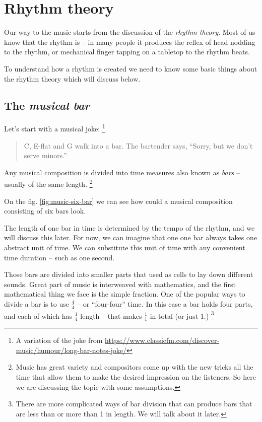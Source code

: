\documentclass[../sparc.tex]{subfiles}
\begin{document}
\newpage
\section{Rhythm theory}

Our way to the music starts from the discussion of the \emph{rhythm theory}.
Most of us know that the rhythm is -- in many people it produces the reflex of
head nodding to the rhythm, or mechanical finger tapping on a tabletop to the
rhythm beats.

To understand how a rhythm is created we need to know some basic things about
the rhythm theory which will discuss below.

\subsection{The \emph{musical bar}}

Let's start with a musical joke: \footnote{A variation of the joke from
\url{https://www.classicfm.com/discover-music/humour/long-bar-notes-joke/}}

\begin{quotation}
C, E-flat and G walk into a bar.  The bartender says, ``Sorry, but we don’t
serve minors.''
\end{quotation}

Any musical composition is divided into time measures also known as \emph{bars}
-- usually of the same length. \footnote{Music has great variety and compositors
come up with the new tricks all the time that allow them to make the desired
impression on the listeners.  So here we are discussing the topic with some
assumptions.}

On the fig. \ref{fig:music-six-bar} we can see how could a musical composition
consisting of six bars look.


The length of one bar in time is determined by the tempo of the rhythm, and we
will discuss this later.  For now, we can imagine that one one bar always takes
one abstract unit of time.  We can substitute this unit of time with any
convenient time duration -- such as one second.

Those bars are divided into smaller parts that used as cells to lay down
different sounds.  Great part of music is interweaved with mathematics, and the
first mathematical thing we face is the simple fraction.  One of the popular
ways to divide a bar is to use $\frac{4}{4}$ -- or ``four-four'' time.  In this
case a bar holds four parts, and each of which has $\frac{1}{4}$ length -- that
makes $\frac{1}{1}$ in total (or just 1.)  \footnote{There are more complicated
ways of bar division that can produce bars that are less than or more than 1 in
length.  We will talk about it later.}
\end{document}
